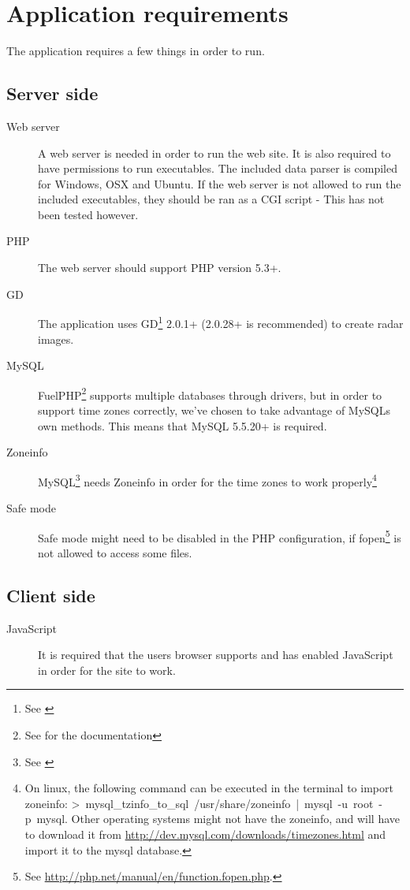 \chapter{Application requirements}
\label{sec:application_requirements}
The application requires a few things in order to run.

\section{Server side}
\begin{description}
\item[Web server] A web server is needed in order to run the web site. It is also required to have permissions to run executables. The included data parser is compiled for Windows, OSX and Ubuntu. If the web server is not allowed to run the included executables, they should be ran as a CGI script - This has not been tested however.
\item[PHP] The web server should support PHP version 5.3+.
\item[GD] The application uses GD\footnote{See \cite{GD}} 2.0.1+ (2.0.28+ is recommended) to create radar images.
\item[MySQL] FuelPHP\footnote{See \cite{fuelphp} for the documentation} supports multiple databases through drivers, but in order to support time zones correctly, we've chosen to take advantage of MySQLs own methods. This means that MySQL 5.5.20+ is required.
\item[Zoneinfo] MySQL\footnote{See \cite{mysql}} needs Zoneinfo  in order for the time zones to work properly\footnote{On linux, the following command can be executed in the terminal to import zoneinfo: \mbox{\textsf{> mysql\_tzinfo\_to\_sql /usr/share/zoneinfo | mysql -u root -p mysql}}. Other operating systems might not have the zoneinfo, and will have to download it from \url{http://dev.mysql.com/downloads/timezones.html} and import it to the mysql database.}
\item[Safe mode] Safe mode might need to be disabled in the PHP configuration, if \textsf{fopen}\footnote{See \url{http://php.net/manual/en/function.fopen.php}.} is not allowed to access some files.
\end{description}

\section{Client side}
\begin{description}
\item[JavaScript] It is required that the users browser supports and has enabled JavaScript in order for the site to work.
\end{description}